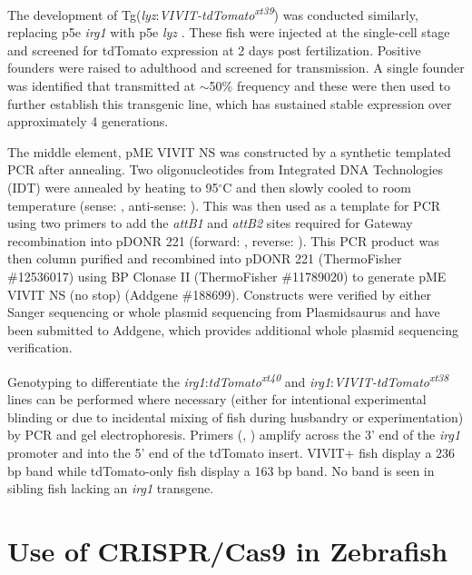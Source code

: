 The development of Tg(\textit{lyz}:\textit{VIVIT\hyp{}tdTomato\textsuperscript{xt39}}) was conducted similarly, replacing p5e \textit{irg1} with p5e \textit{lyz} \citep{Hall2007}. These fish were injected at the single\hyp{}cell stage and screened for tdTomato expression at 2 days post fertilization. Positive founders were raised to adulthood and screened for transmission. A single founder was identified that transmitted at $\sim$50\% frequency and these were then used to further establish this transgenic line, which has sustained stable expression over approximately 4 generations.

The middle element, pME VIVIT NS was constructed by a synthetic templated PCR after annealing. Two oligonucleotides from Integrated DNA Technologies (IDT) were annealed by heating to 95$^{\circ}$C and then slowly cooled to room temperature (sense: , anti\hyp{}sense: ). This was then used as a template for PCR using two primers to add the \textit{attB1} and \textit{attB2} sites required for Gateway recombination into pDONR 221 (forward: , reverse: ). This PCR product was then column purified and recombined into pDONR 221 (ThermoFisher \#12536017) using BP Clonase II (ThermoFisher \#11789020) to generate pME VIVIT NS (no stop) (Addgene \#188699). Constructs were verified by either Sanger sequencing or whole plasmid sequencing from Plasmidsaurus and have been submitted to Addgene, which provides additional whole plasmid sequencing verification.

Genotyping to differentiate the \textit{irg1}:\textit{tdTomato\textsuperscript{xt40}} and \textit{irg1}:\textit{VIVIT\hyp{}tdTomato\textsuperscript{xt38}} lines can be performed where necessary (either for intentional experimental blinding or due to incidental mixing of fish during husbandry or experimentation) by PCR and gel electrophoresis. Primers (, ) amplify across the 3' end of the \textit{irg1} promoter and into the 5' end of the tdTomato insert. VIVIT+ fish display a 236 bp band while tdTomato\hyp{}only fish display a 163 bp band. No band is seen in sibling fish lacking an \textit{irg1} transgene. 

\section{Use of CRISPR/Cas9 in Zebrafish}\label{crispr}

